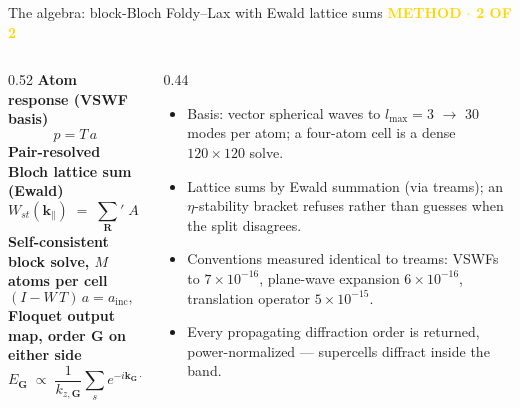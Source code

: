 \documentclass[10pt,aspectratio=169]{beamer}
\newcommand{\kicker}[1]{{\footnotesize\bfseries\textcolor{gold}{#1}}\\[-0.4ex]}
\begin{document}
\begin{frame}{The algebra: block-Bloch Foldy--Lax with Ewald lattice sums}
  \kicker{METHOD  $\cdot$  2 OF 2}
  \begin{columns}[t]
    \begin{column}{0.52\textwidth}
      {\scriptsize\textcolor{golddk}{\textbf{Atom response (VSWF basis)}}}
      \begin{equation*} p = T\,a \end{equation*}
      {\scriptsize\textcolor{golddk}{\textbf{Pair-resolved Bloch lattice sum (Ewald)}}}
      \begin{equation*}
        W_{st}(\mathbf{k}_\parallel) \;=\; {\sum_{\mathbf{R}}}'\;
        A(\boldsymbol{\rho}_t - \boldsymbol{\rho}_s + \mathbf{R})\,
        e^{\,i \mathbf{k}_\parallel \cdot \mathbf{R}}
      \end{equation*}
      {\scriptsize\textcolor{golddk}{\textbf{Self-consistent block solve, $M$ atoms per cell}}}
      \begin{equation*}
        (I - W\,T)\,a = a_{\text{inc}}, \qquad f = T\,a
      \end{equation*}
      {\scriptsize\textcolor{golddk}{\textbf{Floquet output map, order $\mathbf{G}$ on either side}}}
      \begin{equation*}
        E_{\mathbf{G}} \;\propto\; \frac{1}{k_{z,\mathbf{G}}} \sum_s
        e^{-i \mathbf{k}_{\mathbf{G}} \cdot \boldsymbol{\rho}_s}\,
        F_s(\hat{\mathbf{k}}_{\mathbf{G}})
      \end{equation*}
    \end{column}
    \begin{column}{0.44\textwidth}
      \begin{itemize}\small
        \item Basis: vector spherical waves to $l_{\max}=3$ $\rightarrow$ 30 modes per atom; a four-atom cell is a dense $120\times120$ solve.
        \item Lattice sums by Ewald summation (via treams); an $\eta$-stability bracket refuses rather than guesses when the split disagrees.
        \item Conventions measured identical to treams: VSWFs to $7\times10^{-16}$, plane-wave expansion $6\times10^{-16}$, translation operator $5\times10^{-15}$.
        \item Every propagating diffraction order is returned, power-normalized --- supercells diffract inside the band.
      \end{itemize}
    \end{column}
  \end{columns}
\end{frame}
\end{document}
